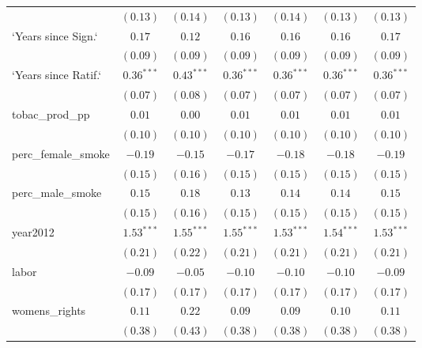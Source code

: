 \begin{table}[!h]
\begin{center}
\begin{tabular}{l c c c c c c }
                        & $(0.13)$     & $(0.14)$     & $(0.13)$     & $(0.14)$     & $(0.13)$     & $(0.13)$     \\
`Years since Sign.`     & $0.17$       & $0.12$       & $0.16$       & $0.16$       & $0.16$       & $0.17$       \\
                        & $(0.09)$     & $(0.09)$     & $(0.09)$     & $(0.09)$     & $(0.09)$     & $(0.09)$     \\
`Years since Ratif.`    & $0.36^{***}$ & $0.43^{***}$ & $0.36^{***}$ & $0.36^{***}$ & $0.36^{***}$ & $0.36^{***}$ \\
                        & $(0.07)$     & $(0.08)$     & $(0.07)$     & $(0.07)$     & $(0.07)$     & $(0.07)$     \\
tobac\_prod\_pp         & $0.01$       & $0.00$       & $0.01$       & $0.01$       & $0.01$       & $0.01$       \\
                        & $(0.10)$     & $(0.10)$     & $(0.10)$     & $(0.10)$     & $(0.10)$     & $(0.10)$     \\
perc\_female\_smoke     & $-0.19$      & $-0.15$      & $-0.17$      & $-0.18$      & $-0.18$      & $-0.19$      \\
                        & $(0.15)$     & $(0.16)$     & $(0.15)$     & $(0.15)$     & $(0.15)$     & $(0.15)$     \\
perc\_male\_smoke       & $0.15$       & $0.18$       & $0.13$       & $0.14$       & $0.14$       & $0.15$       \\
                        & $(0.15)$     & $(0.16)$     & $(0.15)$     & $(0.15)$     & $(0.15)$     & $(0.15)$     \\
year2012                & $1.53^{***}$ & $1.55^{***}$ & $1.55^{***}$ & $1.53^{***}$ & $1.54^{***}$ & $1.53^{***}$ \\
                        & $(0.21)$     & $(0.22)$     & $(0.21)$     & $(0.21)$     & $(0.21)$     & $(0.21)$     \\
labor                   & $-0.09$      & $-0.05$      & $-0.10$      & $-0.10$      & $-0.10$      & $-0.09$      \\
                        & $(0.17)$     & $(0.17)$     & $(0.17)$     & $(0.17)$     & $(0.17)$     & $(0.17)$     \\
womens\_rights          & $0.11$       & $0.22$       & $0.09$       & $0.09$       & $0.10$       & $0.11$       \\
                        & $(0.38)$     & $(0.43)$     & $(0.38)$     & $(0.38)$     & $(0.38)$     & $(0.38)$     \\

\end{tabular}
\end{center}
\end{table}

